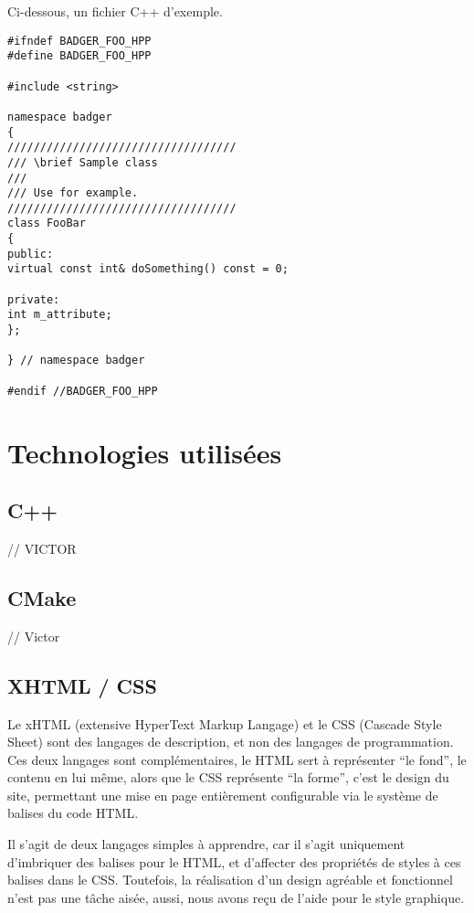 Ci-dessous, un fichier C++ d'exemple.

\begin{lstlisting}
#ifndef BADGER_FOO_HPP
#define BADGER_FOO_HPP

#include <string>

namespace badger
{
///////////////////////////////////
/// \brief Sample class
///
/// Use for example.
///////////////////////////////////
class FooBar
{
public:
virtual const int& doSomething() const = 0;

private:
int m_attribute;
};

} // namespace badger

#endif //BADGER_FOO_HPP
\end{lstlisting}

    \section{Technologies utilisées}

        \subsection{C++}

// VICTOR

        \subsection{CMake}

// Victor

        \subsection{XHTML / CSS}

Le xHTML (extensive HyperText Markup Langage) et le CSS (Cascade Style Sheet) sont
des langages de description, et non des langages de programmation.
Ces deux langages sont complémentaires, le HTML sert à représenter ``le fond'', le contenu
en lui même, alors que le CSS représente ``la forme'', c'est le design du site, permettant
une mise en page entièrement configurable via le système de balises du code HTML.

Il s'agit de deux langages simples à apprendre, car il s'agit uniquement d'imbriquer des
balises pour le HTML, et d'affecter des propriétés de styles à ces balises dans le CSS.
Toutefois, la réalisation d'un design agréable et fonctionnel n'est pas une tâche aisée,
aussi, nous avons reçu de l'aide pour le style graphique.

